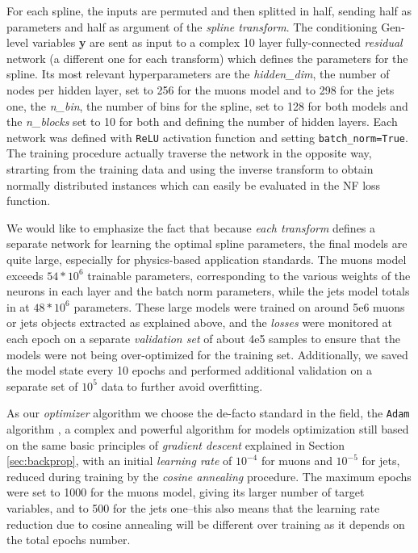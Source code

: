 For each spline, the inputs are permuted and then splitted in half, sending half as parameters and half as argument of the \emph{spline transform}. The conditioning Gen-level variables \textbf{y} are sent as input to a complex 10 layer fully-connected \emph{residual} network (a different one for each transform) which defines the parameters for the spline. Its most relevant hyperparameters are the \emph{hidden\_dim}, the number of nodes per hidden layer, set to 256 for the muons model and to 298 for the jets one, the \emph{n\_bin}, the number of bins for the spline, set to 128 for both models and the \emph{n\_blocks} set to 10 for both and defining the number of hidden layers.
Each network was defined with \texttt{ReLU} activation function and setting \texttt{batch\_norm=True}. The training procedure actually traverse the network in the opposite way, strarting from the training data and using the inverse transform to obtain normally distributed instances which can easily be evaluated in the NF loss function.

We would like to emphasize the fact that because \emph{each transform} defines a separate network for learning the optimal spline parameters, the final models are quite large, especially for physics-based application standards. The muons model exceeds $54*10^6$ trainable parameters, corresponding to the various weights of the neurons in each layer and the batch norm parameters, while the jets model totals in at $48*10^6$ parameters. These large models were trained on around 5e6 muons or jets objects extracted as explained above, and the \emph{losses} were monitored at each epoch on a separate \emph{validation set} of about 4e5 samples to ensure that the models were not being over-optimized for the training set. Additionally, we saved the model state every 10 epochs and performed additional validation on a separate set of $10^5$ data to further avoid overfitting.

As our \emph{optimizer} algorithm we choose the de-facto standard in the field, the \texttt{Adam} algorithm \cite{https://doi.org/10.48550/arxiv.1412.6980}, a complex and powerful algorithm for models optimization still based on the same basic principles of \emph{gradient descent} explained in Section \ref{sec:backprop}, with an initial \emph{learning rate} of $10^{-4}$ for muons and $10^{-5}$ for jets, reduced during training by the \emph{cosine annealing} procedure. The maximum epochs were set to 1000 for the muons model, giving its larger number of target variables, and to 500 for the jets one--this also means that the learning rate reduction due to cosine annealing will be different over training as it depends on the total epochs number.

